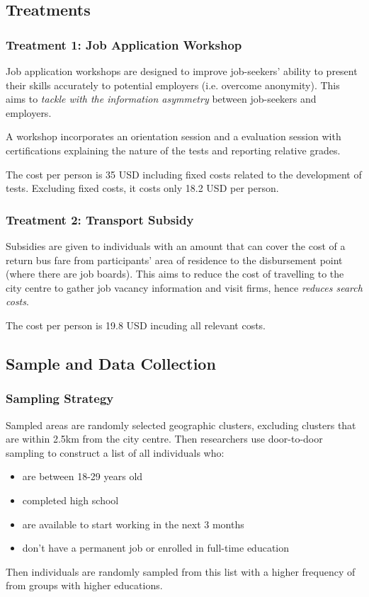     \subsection{Treatments}
    
        \subsubsection{Treatment 1: Job Application Workshop}
            Job application workshops are designed to improve job-seekers' ability to present their skills accurately to potential employers (i.e. overcome anonymity). This aims to \emph{tackle with the information asymmetry} between job-seekers and employers.\par
            A workshop incorporates an orientation session and a evaluation session with certifications explaining the nature of the tests and reporting relative grades.\par
            The cost per person is 35 USD including fixed costs related to the development of tests. Excluding fixed costs, it costs only 18.2 USD per person.
            
        \subsubsection{Treatment 2: Transport Subsidy}
            Subsidies are given to individuals with an amount that can cover the cost of a return bus fare from participants' area of residence to the disbursement point (where there are job boards). This aims to reduce the cost of travelling to the city centre to gather job vacancy information and visit firms, hence \emph{reduces search costs}.\par
            The cost per person is 19.8 USD incuding all relevant costs.
            
    \subsection{Sample and Data Collection}
    
        \subsubsection{Sampling Strategy}
            Sampled areas are randomly selected geographic clusters, excluding clusters that are within 2.5km from the city centre. Then researchers use door-to-door sampling to construct a list of all individuals who:
            \begin{itemize}
                \item are between 18-29 years old
                \item completed high school
                \item are available to start working in the next 3 months
                \item don't have a permanent job or enrolled in full-time education
            \end{itemize}
            Then individuals are randomly sampled from this list with a higher frequency of from groups with higher educations.
            
